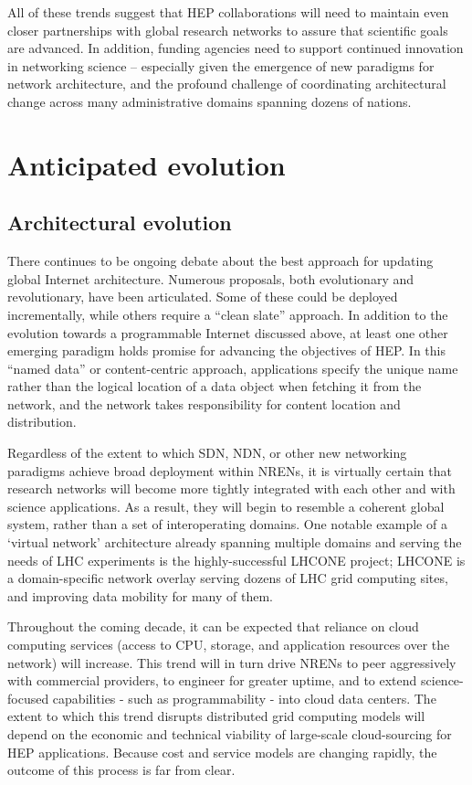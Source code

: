 All of these trends suggest that HEP collaborations will need to maintain even closer partnerships with global research networks to assure that scientific goals are advanced. In addition, funding agencies need to support continued innovation in networking science – especially given the emergence of new paradigms for network architecture, and the profound challenge of coordinating architectural change across many administrative domains spanning dozens of nations.  

\section{Anticipated evolution}

\subsection{Architectural evolution}

There continues to be ongoing debate about the best approach for updating global Internet architecture. Numerous proposals, both evolutionary and revolutionary, have been articulated. Some of these could be deployed incrementally, while others require a “clean slate” approach.  In addition to the evolution towards a programmable Internet discussed above, at least one other emerging paradigm holds promise for advancing the objectives of HEP.  In this “named data” or content-centric approach, applications specify the unique name rather than the logical location of a data object when fetching it from the network, and the network takes responsibility for content location and distribution.  

Regardless of the extent to which SDN, NDN, or other new networking paradigms achieve broad deployment within NRENs, it is virtually certain that research networks will become more tightly integrated with each other and with science applications. As a result, they will begin to resemble a coherent global system, rather than a set of interoperating domains. One notable example of a ‘virtual network’ architecture already spanning multiple domains and serving the needs of LHC experiments is the highly-successful LHCONE\cite{LHCONE} project; LHCONE is a domain-specific network overlay serving dozens of LHC grid computing sites, and improving data mobility for many of them.  

Throughout the coming decade, it can be expected that reliance on cloud computing services (access to CPU, storage, and application resources over the network) will increase.  This trend will in turn drive NRENs to peer aggressively with commercial providers, to engineer for greater uptime, and to extend science-focused capabilities - such as programmability - into cloud data centers. The extent to which this trend disrupts distributed grid computing models will depend on the economic and technical viability of large-scale cloud-sourcing for HEP applications. Because cost and service models are changing rapidly, the outcome of this process is far from clear.  





